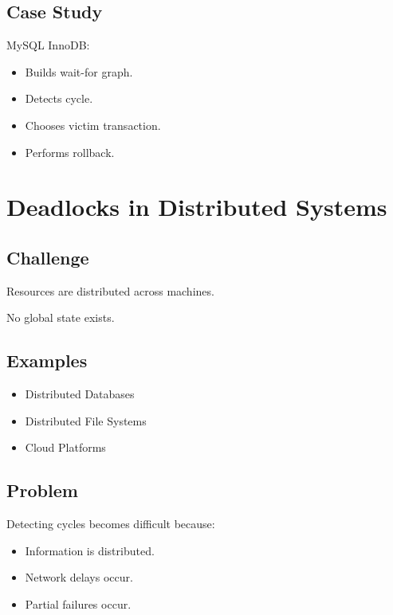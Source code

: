 \subsection{Case Study}

MySQL InnoDB:

\begin{itemize}
\item Builds wait-for graph.
\item Detects cycle.
\item Chooses victim transaction.
\item Performs rollback.
\end{itemize}

\section{Deadlocks in Distributed Systems}

\subsection{Challenge}

Resources are distributed across machines.

No global state exists.

\subsection{Examples}

\begin{itemize}
\item Distributed Databases
\item Distributed File Systems
\item Cloud Platforms
\end{itemize}

\subsection{Problem}

Detecting cycles becomes difficult because:

\begin{itemize}
\item Information is distributed.
\item Network delays occur.
\item Partial failures occur.
\end{itemize}


